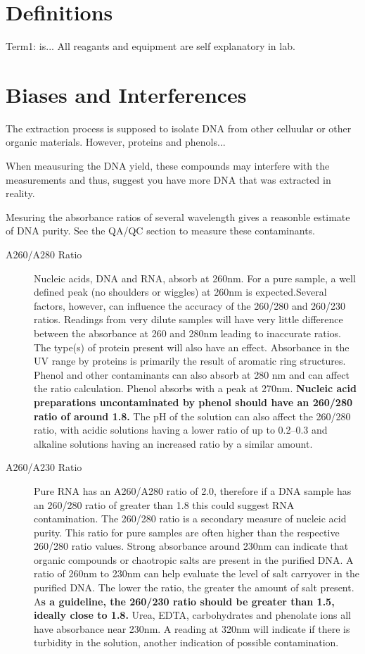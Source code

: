 \documentclass[12pt]{../SOP3_alpha}
\begin{document}
\section{Definitions}

\NP Term1: is... All reagants and equipment are self explanatory in lab. 

\section{Biases and Interferences}

\NP The extraction process is supposed to isolate DNA from other celluular or other organic materials. However, proteins and phenols...  

\NP When meausuring the DNA yield, these compounds may interfere with the measurements and thus, suggest you have more DNA that was extracted in reality. 

\NP Mesuring the absorbance ratios of several wavelength gives a reasonble estimate of DNA purity. See the QA/QC section to measure these contaminants.

\begin{description}
  \item[A260/A280 Ratio] Nucleic acids, DNA and RNA, absorb at 260nm. For a pure sample, a well defined peak (no shoulders or wiggles) at 260nm is expected.Several factors, however, can influence the accuracy of the 260/280 and 260/230 ratios. Readings from very dilute samples will have very little difference between the absorbance at 260 and 280nm leading to inaccurate ratios.  The type(s) of protein present will also have an effect.  Absorbance in the UV range by proteins is primarily the result of aromatic ring structures. Phenol and other contaminants can also absorb at 280 nm and can affect the ratio calculation. Phenol absorbs with a peak at 270nm. \textbf{Nucleic acid preparations uncontaminated by phenol should have an 260/280 ratio of around 1.8. } The pH of the solution can also affect the 260/280 ratio, with acidic solutions having a lower ratio of up to 0.2–0.3 and alkaline solutions having an increased ratio by a similar amount.
  \item[A260/A230 Ratio] Pure RNA has an A260/A280 ratio of 2.0, therefore if a DNA sample has an 260/280 ratio of greater than 1.8 this could suggest RNA contamination. The 260/280 ratio is a secondary measure of nucleic acid purity. This ratio for pure samples are often higher than the respective 260/280 ratio values. Strong absorbance around 230nm can indicate that organic compounds or chaotropic salts are present in the purified DNA.  A ratio of 260nm to 230nm can help evaluate the level of salt carryover in the purified DNA. The lower the ratio, the greater the amount of salt present. A\textbf{s a guideline, the 260/230 ratio should be greater than 1.5, ideally close to 1.8. } Urea, EDTA, carbohydrates and phenolate ions all have absorbance near 230nm. A reading at 320nm will indicate if there is turbidity in the solution, another indication of possible contamination.  

\end{description}
\end{document}
